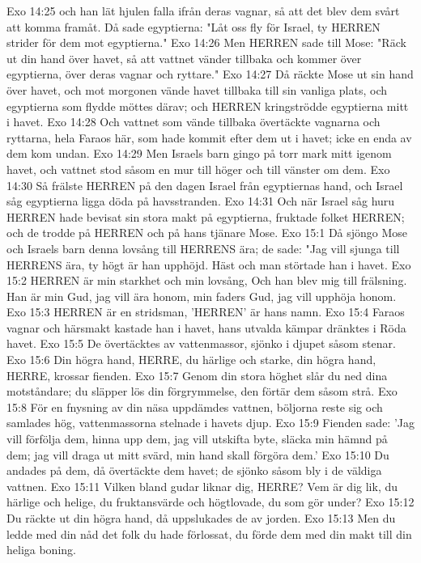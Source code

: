 Exo 14:25  och han lät hjulen falla ifrån deras vagnar, så att det blev dem svårt att komma framåt. Då sade egyptierna: "Låt oss fly för Israel, ty HERREN strider för dem mot egyptierna."
Exo 14:26  Men HERREN sade till Mose: "Räck ut din hand över havet, så att vattnet vänder tillbaka och kommer över egyptierna, över deras vagnar och ryttare."
Exo 14:27  Då räckte Mose ut sin hand över havet, och mot morgonen vände havet tillbaka till sin vanliga plats, och egyptierna som flydde möttes därav; och HERREN kringströdde egyptierna mitt i havet.
Exo 14:28  Och vattnet som vände tillbaka övertäckte vagnarna och ryttarna, hela Faraos här, som hade kommit efter dem ut i havet; icke en enda av dem kom undan.
Exo 14:29  Men Israels barn gingo på torr mark mitt igenom havet, och vattnet stod såsom en mur till höger och till vänster om dem.
Exo 14:30  Så frälste HERREN på den dagen Israel från egyptiernas hand, och Israel såg egyptierna ligga döda på havsstranden.
Exo 14:31  Och när Israel såg huru HERREN hade bevisat sin stora makt på egyptierna, fruktade folket HERREN; och de trodde på HERREN och på hans tjänare Mose.
Exo 15:1  Då sjöngo Mose och Israels barn denna lovsång till HERRENS ära; de sade: "Jag vill sjunga till HERRENS ära, ty högt är han upphöjd. Häst och man störtade han i havet.
Exo 15:2  HERREN är min starkhet och min lovsång, Och han blev mig till frälsning. Han är min Gud, jag vill ära honom, min faders Gud, jag vill upphöja honom.
Exo 15:3  HERREN är en stridsman, 'HERREN' är hans namn.
Exo 15:4  Faraos vagnar och härsmakt kastade han i havet, hans utvalda kämpar dränktes i Röda havet.
Exo 15:5  De övertäcktes av vattenmassor, sjönko i djupet såsom stenar.
Exo 15:6  Din högra hand, HERRE, du härlige och starke, din högra hand, HERRE, krossar fienden.
Exo 15:7  Genom din stora höghet slår du ned dina motståndare; du släpper lös din förgrymmelse, den förtär dem såsom strå.
Exo 15:8  För en fnysning av din näsa uppdämdes vattnen, böljorna reste sig och samlades hög, vattenmassorna stelnade i havets djup.
Exo 15:9  Fienden sade: 'Jag vill förfölja dem, hinna upp dem, jag vill utskifta byte, släcka min hämnd på dem; jag vill draga ut mitt svärd, min hand skall förgöra dem.'
Exo 15:10  Du andades på dem, då övertäckte dem havet; de sjönko såsom bly i de väldiga vattnen.
Exo 15:11  Vilken bland gudar liknar dig, HERRE? Vem är dig lik, du härlige och helige, du fruktansvärde och högtlovade, du som gör under?
Exo 15:12  Du räckte ut din högra hand, då uppslukades de av jorden.
Exo 15:13  Men du ledde med din nåd det folk du hade förlossat, du förde dem med din makt till din heliga boning.
